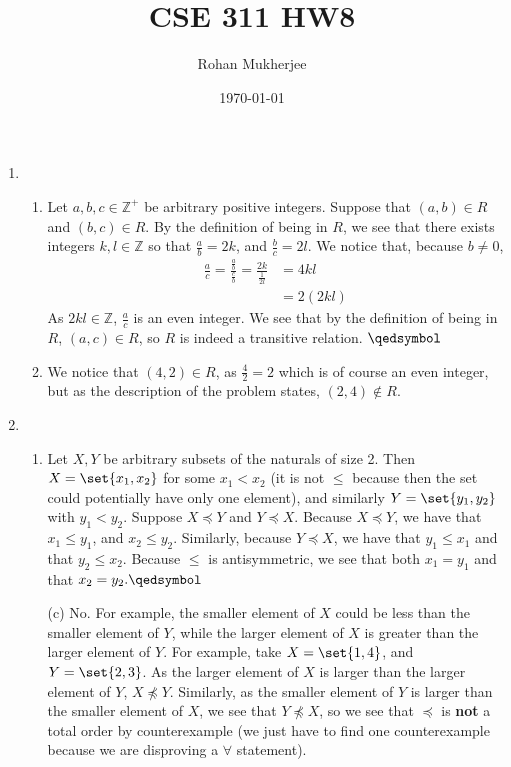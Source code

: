 \documentclass[12pt]{article}
\title{CSE 311 HW8}
\date{\today}
\author{Rohan Mukherjee}
\def\mbb#1{\mathbb{#1}}
\def\bZ{\mbb{Z}}
\theoremstyle{definition}
\theoremstyle{remark}
\renewcommand{\qed}{\hfill\qedsymbol}
\begin{document}
	\maketitle
	\begin{enumerate}[leftmargin=\labelsep]
		\item
		\begin{enumerate}
			\item Let $a, b, c \in \bZ^+$ be arbitrary positive integers. Suppose that $(a, b) \in R$ and $(b, c) \in R$. By the definition of being in $R$, we see that there exists integers $k, l \in \bZ$ so that $\frac ab = 2k$, and $\frac bc = 2l$. We notice that, because $b \neq 0$, 
			\begin{align*}
				\frac ac = \frac{\frac ab}{\frac cb} = \frac{2k}{\frac 1{2l}} &= 4kl 
				\\& = 2(2kl)
			\end{align*}
			As $2kl \in \bZ$, $\frac ac$ is an even integer. We see that by the definition of being in $R$, $(a, c) \in R$, so $R$ is indeed a transitive relation. $\qed$
			\item We notice that $(4, 2) \in R$, as $\frac 42 = 2$ which is of course an even integer, but as the description of the problem states, $(2, 4) \not \in R$.
		\end{enumerate}
	
		\newpage
		\item
		\begin{enumerate}
			\item Let $X, Y$ be arbitrary subsets of the naturals of size 2. Then $X = \set{x_1, x_2}$ for some $x_1 < x_2$ (it is not $\leq$ because then the set could potentially have only one element), and similarly $Y = \set{y_1, y_2}$ with $y_1 < y_2$. Suppose $X \preceq Y$ and $Y \preceq X$. Because $X \preceq Y$, we have that $x_1 \leq y_1$, and $x_2 \leq y_2$. Similarly, because $Y \preceq X$, we have that $y_1 \leq x_1$ and that $y_2 \leq x_2$. Because $\leq$ is antisymmetric, we see that both $x_1 = y_1$ and that $x_2 = y_2. \qed$
			
			\item[(c)] No. For example, the smaller element of $X$ could be less than the smaller element of $Y$, while the larger element of $X$ is greater than the larger element of $Y$. For example, take $X = \set{1, 4}$, and $Y = \set{2, 3}$. As the larger element of $X$ is larger than the larger element of $Y$, $X \not \preceq Y$. Similarly, as the smaller element of $Y$ is larger than the smaller element of $X$, we see that $Y \not \preceq X$, so we see that $\preceq$ is \textbf{not} a total order by counterexample (we just have to find one counterexample because we are disproving a $\forall$ statement).
			

\end{enumerate}
\end{enumerate}
\end{document}
